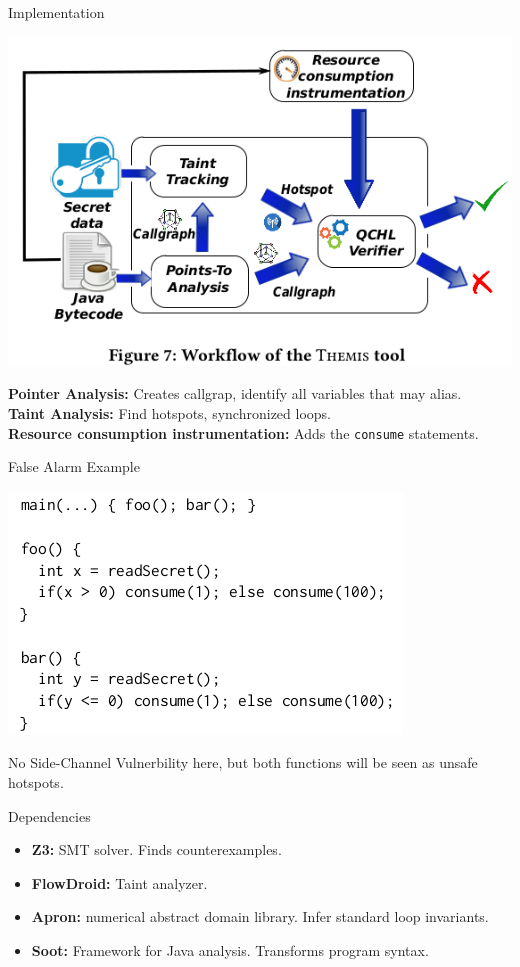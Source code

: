 \documentclass[page number]{beamer}
\begin{document}
\begin{frame}{Implementation}
  \begin{center}
    \includegraphics[scale=0.35]{img_chen/7.png}
  \end{center}
  \textbf{Pointer Analysis:} Creates callgrap, identify all variables that may alias.\\
  \textbf{Taint Analysis:} Find hotspots, synchronized loops.\\
  \textbf{Resource consumption instrumentation:} Adds the \texttt{consume} statements.
\end{frame}

\begin{frame}{False Alarm Example}
  \begin{center}
    \includegraphics[scale=0.4]{img_chen/foobar.png}
  \end{center}
  \vfill
  No Side-Channel Vulnerbility here, but both functions will be seen as unsafe hotspots.
\end{frame}

\begin{frame}{Dependencies}
  \begin{itemize}
  \item \textbf{Z3:} SMT solver. Finds counterexamples.
  \item \textbf{FlowDroid:} Taint analyzer.
  \item \textbf{Apron:} numerical abstract domain library. Infer standard loop invariants.
  \item \textbf{Soot:} Framework for Java analysis. Transforms program syntax.
  \end{itemize}
\end{frame}
\end{document}
